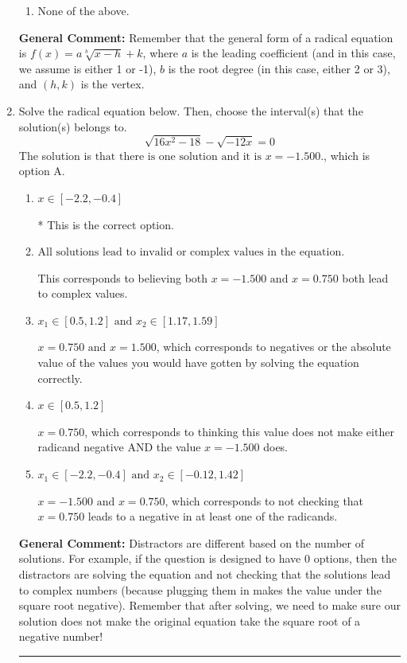 \documentclass{extbook}[14pt]
\newcommand{\litem}[1]{\item #1

\rule{\textwidth}{0.4pt}}
\begin{document}
\begin{enumerate}
{\begin{enumerate}[label=\Alph*.]
\item None of the above.\end{enumerate}
\textbf{General Comment:} Remember that the general form of a radical equation is $ f(x) = a \sqrt[b]{x - h} + k $, where $a$ is the leading coefficient (and in this case, we assume is either 1 or -1), $b$ is the root degree (in this case, either 2 or 3), and $(h, k)$ is the vertex.
}
\litem{
Solve the radical equation below. Then, choose the interval(s) that the solution(s) belongs to.
\[ \sqrt{16 x^2 - 18} - \sqrt{-12 x} = 0 \]The solution is \( \text{that there is one solution and it is } x = -1.500. \), which is option A.\begin{enumerate}[label=\Alph*.]
\item \( x \in [-2.2,-0.4] \)

* This is the correct option.
\item \( \text{All solutions lead to invalid or complex values in the equation.} \)

This corresponds to believing both $x = -1.500 \text{ and } x = 0.750$ both lead to complex values.
\item \( x_1 \in [0.5, 1.2] \text{ and } x_2 \in [1.17,1.59] \)

$x = 0.750 \text{ and } x = 1.500$, which corresponds to negatives or the absolute value of the values you would have gotten by solving the equation correctly.
\item \( x \in [0.5,1.2] \)

$x = 0.750$, which corresponds to thinking this value does not make either radicand negative AND the value $x = -1.500$ does.
\item \( x_1 \in [-2.2, -0.4] \text{ and } x_2 \in [-0.12,1.42] \)

$x = -1.500 \text{ and } x = 0.750$, which corresponds to not checking that $x = 0.750$ leads to a negative in at least one of the radicands.
\end{enumerate}

\textbf{General Comment:} Distractors are different based on the number of solutions. For example, if the question is designed to have 0 options, then the distractors are solving the equation and not checking that the solutions lead to complex numbers (because plugging them in makes the value under the square root negative). Remember that after solving, we need to make sure our solution does not make the original equation take the square root of a negative number!
}
\end{enumerate}
\end{document}
